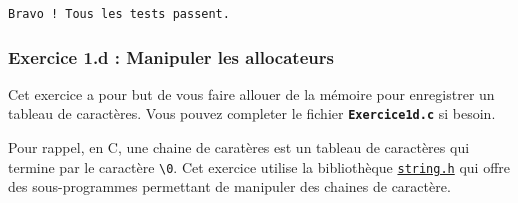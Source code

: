 \documentclass[11pt]{article}
\begin{document}
    \begin{Verbatim}[commandchars=\\\{\}]
Bravo ! Tous les tests passent.

    \end{Verbatim}

    \subsubsection{Exercice 1.d : Manipuler les
allocateurs}\label{exercice-1.d-manipuler-les-allocateurs}

Cet exercice a pour but de vous faire allouer de la mémoire pour
enregistrer un tableau de caractères. Vous pouvez completer le fichier
\textbf{\texttt{Exercice1d.c}} si besoin.

Pour rappel, en C, une chaine de caratères est un tableau de caractères
qui termine par le caractère \texttt{\textbackslash{}0}. Cet exercice
utilise la bibliothèque
\href{https://fr.wikipedia.org/wiki/String.h}{\texttt{string.h}} qui
offre des sous-programmes permettant de manipuler des chaines de
caractère.
\end{document}
